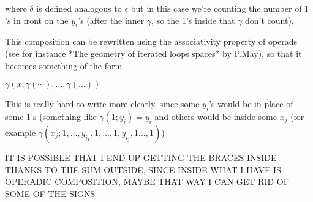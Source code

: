 \documentclass[twoside]{article}
\begin{document}
where $\delta$ is defined analogous to $\epsilon$ but in this case we're counting the number of $1$'s in front on the $y_i$'s (after the inner $\gamma$, so the $1$'s inside that $\gamma$ don't count).

This composition can be rewritten using the associativity property of operads (see for instance *The geometry of iterated loops spaces* by P.May), so that it becomes something of the form

$\gamma(x;\gamma(\cdots),\dots, \gamma(\dots))$

This is really hard to write more clearly, since some $y_i$'s would be in place of some $1$'s (something like $\gamma(1;y_i)=y_i$ and others would be inside some $x_j$ (for example $\gamma(x_j;1,\dots, y_{i_1}, 1,\dots, 1,y_{i_j},1\dots,1)$)

IT IS POSSIBLE THAT I END UP GETTING THE BRACES INSIDE THANKS TO THE SUM OUTSIDE, SINCE INSIDE WHAT I HAVE IS OPERADIC COMPOSITION, MAYBE THAT WAY I CAN GET RID OF SOME OF THE SIGNS
\end{document}
